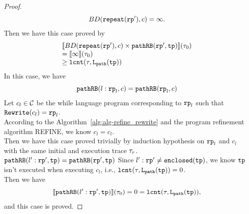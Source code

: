 \begin{proof}
\[
  BD(\mathtt{repeat}(\mathtt{rp}'), c) = \infty.
\]
Then we have this case proved by
\[
  \begin{array}{l}
  \llbracket BD(\mathtt{repeat}(\mathtt{rp}'), c) \times \mathtt{pathRB}(\mathtt{rp}', \mathtt{tp}) \rrbracket(\mathtt{\tau}_0) 
  \\
  =
  \llbracket  \infty  \rrbracket(\mathtt{\tau}_0) 
  \\
  \geq \mathtt{lcnt}(\mathtt{\tau}, \mathtt{L}_{\mathtt{path}}(\mathtt{tp})) 
  \end{array}
  \]
  In this case, we have
  \[
    \mathtt{pathRB}(l: \mathtt{rp}_l, c) = \mathtt{pathRB}(\mathtt{rp}_l, c)
  \]
  Let $c_l \in \mathcal{C}$ be the while language program corresponding to $\mathtt{rp}_l$ such that $\mathtt{Rewrite}(c_l) = \mathtt{rp}_l$.
  \\
  According to the Algorithm~\ref{alg:alg-refine_rewrite} and the program refinement algorithm REFINE, we know
  $c_l = c_l$.
  \\
  Then we have this case proved trivially by induction hypothesis on $\mathtt{rp}_l$ and $c_l$ with the same initial and execution trace $\mathtt{\tau}_r$.
$\mathtt{pathRB}(l': \mathtt{rp}', \mathtt{tp}) = \mathtt{pathRB}(\mathtt{rp}', \mathtt{tp})$ 
Since $l': \mathtt{rp}' \neq \mathtt{enclosed}(\mathtt{tp})$, we know $\mathtt{tp}$ isn't executed when executing $c_l$, i.e., $\mathtt{lcnt}(\mathtt{\tau}, \mathtt{L}_{\mathtt{path}}(\mathtt{tp})) = 0$.
\\
Then we have
\[
  \llbracket \mathtt{pathRB}(l': \mathtt{rp}', \mathtt{tp}) \rrbracket(\mathtt{\tau}_0) = 0 = \mathtt{lcnt}(\mathtt{\tau}, \mathtt{L}_{\mathtt{path}}(\mathtt{tp})),
  \]
and this case is proved.
\end{proof}



